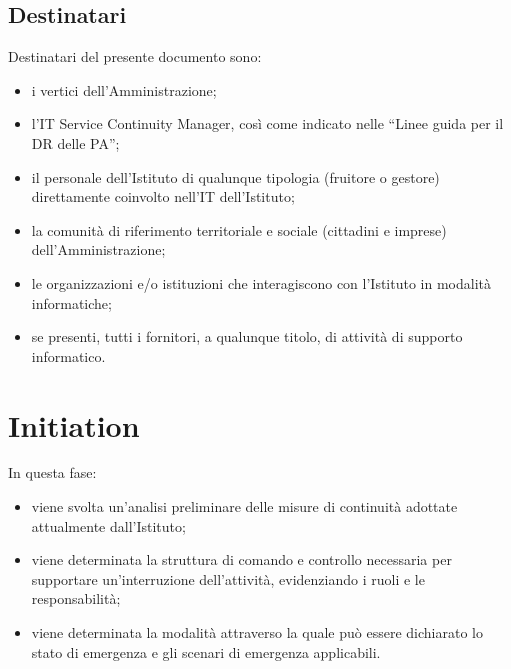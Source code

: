\subsection{Destinatari}
Destinatari del presente documento sono: 
\begin{itemize}
\item i vertici dell’Amministrazione; 
\item l'IT Service Continuity Manager, così come indicato nelle “Linee guida per il DR delle PA”;
\item il  personale  dell'Istituto  di  qualunque  tipologia  (fruitore  o  gestore)  direttamente coinvolto nell’IT dell'Istituto;
\item la comunità di riferimento territoriale e sociale (cittadini e imprese) dell’Amministrazione; 
\item le  organizzazioni  e/o  istituzioni  che  interagiscono con  l'Istituto  in  modalità informatiche; 
\item se presenti, tutti i fornitori, a qualunque titolo, di attività di supporto informatico. 
\end{itemize}
















































\newpage
\section{Initiation}
In questa fase:
\begin{itemize}
\item viene svolta un'analisi preliminare delle misure di continuità adottate attualmente dall'Istituto;
\item viene determinata la struttura di comando e controllo necessaria per supportare un'interruzione dell'attività, evidenziando i ruoli e le responsabilità;
\item viene determinata la modalità attraverso la quale può essere dichiarato lo stato di emergenza e gli scenari di emergenza applicabili.
\end{itemize}

